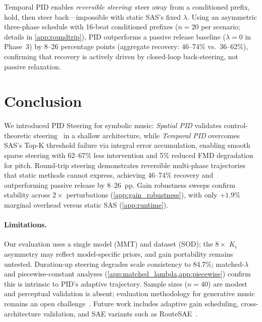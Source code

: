 \documentclass{article}
\theoremstyle{plain}
\begin{document}
Temporal PID enables \emph{reversible steering}: steer away from a conditioned prefix, hold, then steer back---impossible with static SAS's fixed $\lambda$. Using an asymmetric three-phase schedule with 16-beat conditioned prefixes ($n{=}20$ per scenario; details in \cref{app:roundtrip}), PID outperforms a passive release baseline ($\lambda{=}0$ in Phase~3) by 8--26 percentage points (aggregate recovery: 46--74\% vs.\ 36--62\%), confirming that recovery is actively driven by closed-loop back-steering, not passive relaxation.

\section{Conclusion}
\label{sec:conclusion}

We introduced PID Steering for symbolic music: \emph{Spatial PID} validates control-theoretic steering~\cite{nguyen2026pid} in a shallow architecture, while \emph{Temporal PID} overcomes SAS's Top-K threshold failure via integral error accumulation, enabling smooth sparse steering with 62--67\% less intervention and 5\% reduced FMD degradation for pitch. Round-trip steering demonstrates reversible multi-phase trajectories that static methods cannot express, achieving 46--74\% recovery and outperforming passive release by 8--26~pp. Gain robustness sweeps confirm stability across $2{\times}$ perturbations (\cref{app:gain_robustness}), with only $+1.9\%$ marginal overhead versus static SAS (\cref{app:runtime}).


\paragraph{Limitations.}
Our evaluation uses a single model (MMT) and dataset (SOD); the $8{\times}$ $K_i$ asymmetry may reflect model-specific priors, and gain portability remains untested. Duration-up steering degrades scale consistency to 84.7\%; matched-$\lambda$ and piecewise-constant analyses (\cref{app:matched_lambda,app:piecewise}) confirm this is intrinsic to PID's adaptive trajectory. Sample sizes ($n{=}40$) are modest and perceptual validation is absent; evaluation methodology for generative music remains an open challenge~\cite{lerch2025survey}. Future work includes adaptive gain scheduling, cross-architecture validation, and SAE variants such as RouteSAE~\cite{shi2025routesae}.
\end{document}
